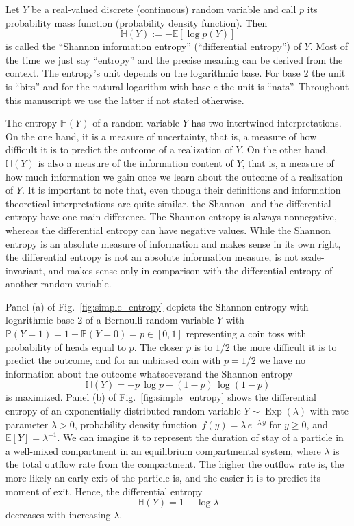 \documentclass[smallextended]{svjour3}
\renewcommand{\P}{\mathbb{P}}
\newcommand{\E}{\mathbb{E}}
\renewcommand{\H}{\mathbb{H}}
\newcommand{\Exp}{\operatorname{Exp}}
\newcommand{\bits}{\mathrm{bits}}
\newcommand{\nats}{\mathrm{nats}}
\newcommand{\ie}{that is}
\newcommand{\pdf}{probability density function}
\renewcommand{\emph}[1]{``#1''}
\providecommand{\DIFaddtex}[1]{{\protect\color{blue}\uwave{#1}}} %
\providecommand{\DIFaddbegin}{} %
\providecommand{\DIFaddend}{} %
\providecommand{\DIFadd}[1]{\texorpdfstring{\DIFaddtex{#1}}{#1}} %
\newcommand{\DIFaddincludegraphics}[2][]{{\color{blue}\fbox{\DIFOincludegraphics[#1]{#2}}}} %
\DeclareRobustCommand{\DIFaddbegin}{\DIFOaddbegin \let\includegraphics\DIFaddincludegraphics} %
\DeclareRobustCommand{\DIFaddend}{\DIFOaddend \let\includegraphics\DIFOincludegraphics} %
\begin{document}
Let $Y$ be a real-valued discrete (continuous) random variable and call $p$ its probability mass function (\pdf).
Then
\begin{equation}
  \DIFaddbegin \label{eqn:entropy}
  \DIFaddend \H(Y) := -\E\left[\log p(Y)\right]
\end{equation}
is called the \emph{Shannon information entropy} (\emph{differential entropy}) of $Y$.
Most of the time we just say \emph{entropy} and the precise meaning can be derived from the context.
The entropy's unit depends on the logarithmic base.
For base $2$ the unit is \emph{$\bits$} and for the natural logarithm with base $e$ the unit is \emph{$\nats$}.
Throughout this manuscript we use the latter if not stated otherwise.

The entropy $\H(Y)$ of a random variable $Y$ has two intertwined interpretations.
On the one hand, it is a measure of uncertainty, \ie, a measure of how difficult it is to predict the outcome of a realization of $Y$.
On the other hand, $\H(Y)$ is also a measure of the information content of $Y$, \ie, a measure of how much information we gain once we learn about the outcome of a realization of $Y$.
It is important to note that, even though their definitions and information theoretical interpretations are quite similar, the Shannon- and the differential entropy have one main difference.
The Shannon entropy is always nonnegative, whereas the differential entropy can have negative values.
While the Shannon entropy is an absolute measure of information and makes sense in its own right, the differential entropy is not an absolute information measure, is not scale-invariant, and makes sense only in comparison with the differential entropy of another random variable.

Panel (a) of Fig.~\ref{fig:simple_entropy} depicts the Shannon entropy with logarithmic base $2$ of a Bernoulli random variable $Y$ with $\P(Y=1)=1-\P(Y=0)=p\in[0,1]$ representing a coin toss with probability of heads equal to $p$.
The closer $p$ is to $1/2$ the more difficult it is to predict the outcome, and for an unbiased coin with $p=1/2$ we have no information about the outcome whatsoever\DIFaddbegin \DIFadd{, }\DIFaddend and the Shannon entropy
\begin{equation}
	\H(Y) = -p\,\log p - (1-p)\,\log(1-p)
\end{equation}
is maximized.
Panel (b) of Fig.~\ref{fig:simple_entropy} shows the differential entropy of an exponentially distributed random variable $Y\sim\Exp(\lambda)$ with rate parameter $\lambda>0$, \pdf\ $f(y) = \lambda\,e^{-\lambda\,y}$ for $y\geq0$, and $\E\left[Y\right]=\lambda^{-1}$.
We can imagine it to represent the duration of stay of a particle in a well-mixed compartment in an equilibrium compartmental system, where $\lambda$ is the total outflow rate from the compartment.
The higher the outflow rate is, the more likely an early exit of the particle is, and the easier it is to predict its moment of exit.
Hence, the differential entropy 
\begin{equation}
	\H(Y) = 1-\log\lambda
\end{equation}
decreases with increasing $\lambda$.
\end{document}
